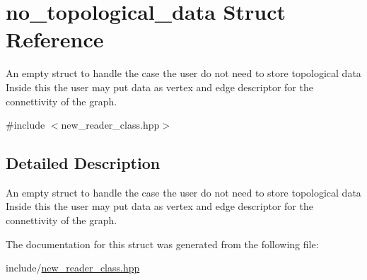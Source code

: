 \hypertarget{structno__topological__data}{
\section{no\_\-topological\_\-data Struct Reference}
\label{structno__topological__data}
}


An empty struct to handle the case the user do not need to store topological data  Inside this the user may put data as vertex and edge descriptor for the connettivity of the graph.  


{\ttfamily \#include $<$new\_\-reader\_\-class.hpp$>$}

\subsection{Detailed Description}
An empty struct to handle the case the user do not need to store topological data  Inside this the user may put data as vertex and edge descriptor for the connettivity of the graph. 

The documentation for this struct was generated from the following file:\begin{DoxyCompactItemize}
\item 
include/\hyperlink{new__reader__class_8hpp}{new\_\-reader\_\-class.hpp}\end{DoxyCompactItemize}
